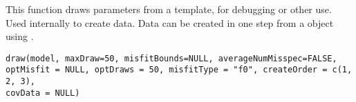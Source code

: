 \documentclass[a4paper]{book}
\begin{document}
%
\begin{Description}\relax
This function draws parameters from a  template, for debugging or other use. Used internally to create data. Data can be created in one step from a  object using .
\end{Description}
%
\begin{Usage}
\begin{verbatim}
draw(model, maxDraw=50, misfitBounds=NULL, averageNumMisspec=FALSE, 
optMisfit = NULL, optDraws = 50, misfitType = "f0", createOrder = c(1, 2, 3),
covData = NULL)
\end{verbatim}
\end{Usage}
%
\end{document}
